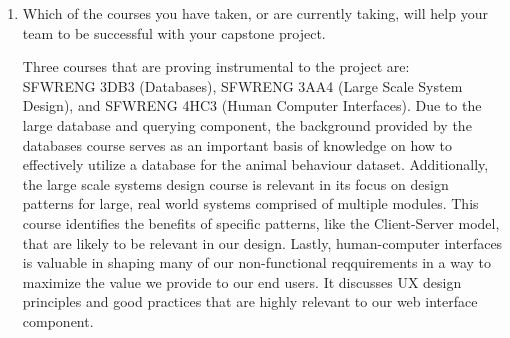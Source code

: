 \begin{enumerate}
  \item Which of the courses you have taken, or are currently taking, will help your team to be successful with your capstone project.
  \par{Three courses that are proving instrumental to the project are: \\ SFWRENG 3DB3 (Databases), SFWRENG 3AA4 (Large Scale System Design), and SFWRENG 4HC3 (Human Computer Interfaces). Due to the large database and querying component, the background provided by the databases course serves as an important basis of knowledge on how to effectively utilize a database for the animal behaviour dataset. Additionally, the large scale systems design course is relevant in its focus on design patterns for large, real world systems comprised of multiple modules. This course identifies the benefits of specific patterns, like the Client-Server model, that are likely to be relevant in our design. Lastly, human-computer interfaces is valuable in shaping many of our non-functional reqquirements in a way to maximize the value we provide to our end users. It discusses UX design principles and good practices that are highly relevant to our web interface component.  }
\end{enumerate}